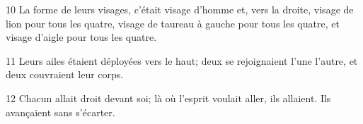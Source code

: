 
10 La forme de leurs visages, c’était visage d’homme et, vers la droite, visage de lion pour tous les quatre, visage de taureau à gauche pour tous les quatre, et visage d’aigle pour tous les quatre.

11 Leurs ailes étaient déployées vers le haut; deux se rejoignaient l’une l’autre, et deux couvraient leur corps.

12 Chacun allait droit devant soi; là où l’esprit voulait aller, ils allaient. Ils avançaient sans s’écarter.